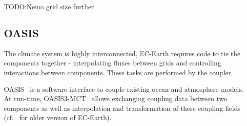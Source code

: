 TODO:Nemo grid size further

\subsection{OASIS}
The climate system is highly interconnected, EC-Earth requires code to tie the components together - interpolating fluxes between grids and controlling interactions between components. These tasks are performed by the coupler.

OASIS~\cite{gmd-6-373-2013} is a software interface to couple existing ocean and atmosphere models. At run-time, OASIS3-MCT~\cite{oasis3-mct} allows exchanging coupling data between two components as well as interpolation and transformation of these coupling fields 
(cf.~\cite{TM673} for older version of EC-Earth).


% 
%  



